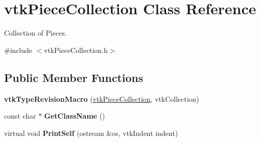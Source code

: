 \hypertarget{classvtkPieceCollection}{
\section{vtkPieceCollection Class Reference}
\label{classvtkPieceCollection}
}


Collection of Pieces.  




{\ttfamily \#include $<$vtkPieceCollection.h$>$}

\subsection*{Public Member Functions}
\begin{DoxyCompactItemize}
\item 
\hypertarget{classvtkPieceCollection_a6325b41535ab86ad38c374cd0890bbec}{
{\bfseries vtkTypeRevisionMacro} (\hyperlink{classvtkPieceCollection}{vtkPieceCollection}, vtkCollection)}
\label{classvtkPieceCollection_a6325b41535ab86ad38c374cd0890bbec}

\item 
\hypertarget{classvtkPieceCollection_a6beb43592ed047683006119f367afb07}{
const char $\ast$ {\bfseries GetClassName} ()}
\label{classvtkPieceCollection_a6beb43592ed047683006119f367afb07}

\item 
\hypertarget{classvtkPieceCollection_a48b9ead9a2fc5689307603366473058c}{
virtual void {\bfseries PrintSelf} (ostream \&os, vtkIndent indent)}
\label{classvtkPieceCollection_a48b9ead9a2fc5689307603366473058c}


\end{DoxyCompactItemize}
